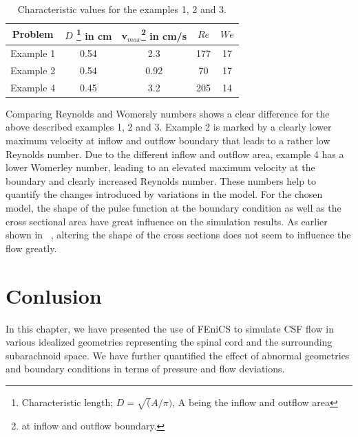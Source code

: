 \begin{table}\begin{center}
    \begin{tabular}{ | c | c | c | c | c |}
    \hline
    Problem & $D$ \footnote{Characteristic length; $D=\sqrt(A/\pi)$, A being the inflow and outflow area} in cm & $\mathbf{v}_{max}$\footnote{at inflow and outflow boundary.} in cm/s  & $Re$ & $We$ \\ \hline\hline
	Example 1 	&	0.54 & 2.3 & 177 & 17	\\ \hline
	Example 2	&	0.54 & 0.92 & 70 & 17	\\ \hline
	Example 4	&	0.45 & 3.2 	& 205 & 14	\\ \hline
    \end{tabular}
	\label{tab:Re_We}
	\caption{Characteristic values for the examples 1, 2 and 3.}
\end{center}\end{table}

Comparing Reynolds and Womersly numbers shows a clear difference for
the above described examples 1, 2 and 3. Example 2 is marked by a
clearly lower maximum velocity at inflow and outflow boundary that
leads to a rather low Reynolds number. Due to the different inflow and
outflow area, example 4 has a lower Womerley number, leading to an
elevated maximum velocity at the boundary and clearly increased
Reynolds number. These numbers help to quantify the changes
introduced by variations in the model. For the chosen model, the shape
of the pulse function at the boundary condition as well as the cross
sectional area have great influence on the simulation results. As
earlier shown in ~\cite{Loth2001}, altering the shape of
the cross sections does not seem to influence the flow greatly.


\section{Conlusion}
In this chapter, we have presented the use of FEniCS to simulate CSF flow in various idealized geometries representing the
spinal cord and the surrounding subarachnoid space. We have further 
quantified the effect of abnormal geometries and boundary conditions 
in terms of pressure and flow deviations.  

